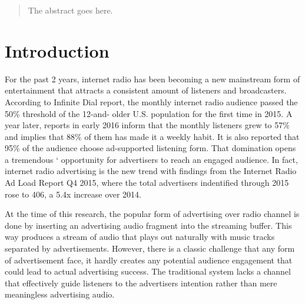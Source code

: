 \documentclass[conference]{IEEEtran}
\begin{document}
\maketitle

\begin{abstract}
The abstract goes here.
\end{abstract}





%
\IEEEpeerreviewmaketitle



\section{Introduction}

For the past 2 years, internet radio has been becoming a new mainstream form of entertainment that attracts a consistent amount 
of listeners and broadcasters. According to Infinite Dial report, the monthly internet radio audience passed the 50\% threshold of the 12-and-
older U.S. population for the first time in 2015. A year later, reports in early 2016 inform that the monthly 
listeners grew to 57\% and implies that 88\% of them has made it a weekly habit. It is also reported
that 95\% of the audience choose ad-supported listening form. That domination opens a tremendous `
opportunity for advertisers to reach an engaged audience. In fact, internet radio advertising is the new trend with findings from the Internet Radio Ad Load Report Q4 2015, where the total advertisers indentified through 2015 rose to 406, a 5.4x increase over 2014.

At the time of this research, the popular form of advertising over radio channel is done by inserting an advertising audio fragment into the streaming buffer. This way produces a stream of audio that plays out naturally with music tracks separated by advertisements. However, there is a classic challenge that any form of advertisement face, it hardly creates any potential audience engagement that could lead to actual advertising success. The traditional system lacks a channel that effectively guide listeners to the advertisers intention rather than mere meaningless advertising audio.
\end{document}
